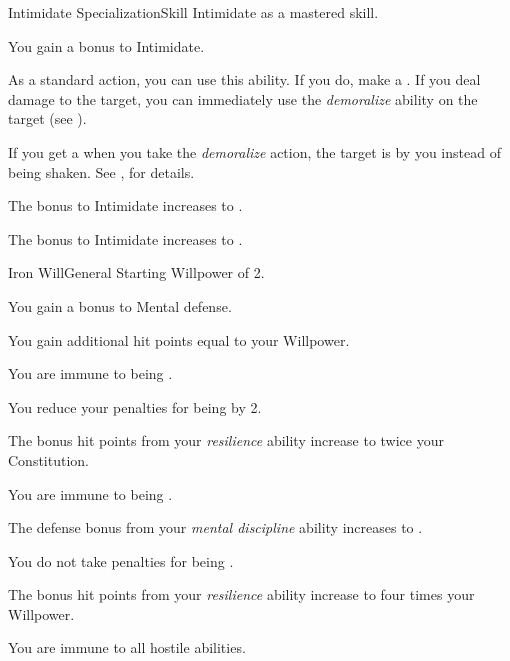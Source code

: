     \begin{feat}{Intimidate Specialization}{Skill}
        \featpre Intimidate as a mastered skill.
        \featben

         You gain a  bonus to Intimidate.

         As a standard action, you can use this ability.
        If you do, make a .
        If you deal damage to the target, you can immediately use the \textit{demoralize} ability on the target (see ).

         If you get a  when you take the \textit{demoralize} action, the target is \frightened by you instead of being shaken.
        See , for details.

         The bonus to Intimidate increases to .

         The bonus to Intimidate increases to .
    \end{feat}

    \begin{feat}{Iron Will}{General}
        \featpre Starting Willpower of 2.
        \featben

         You gain a  bonus to Mental defense.

         You gain additional hit points equal to your Willpower.

         You are immune to being .

         You reduce your penalties for being  by 2.

         The bonus hit points from your \textit{resilience} ability increase to twice your Constitution.

         You are immune to being .

         The defense bonus from your \textit{mental discipline} ability increases to .

         You do not take penalties for being .

         The bonus hit points from your \textit{resilience} ability increase to four times your Willpower.

         You are immune to all hostile  abilities.
    \end{feat}

